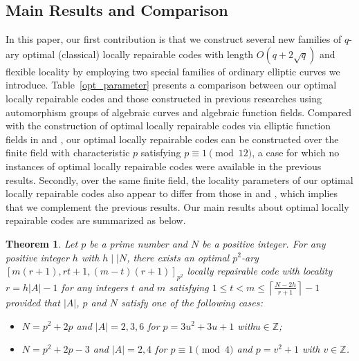 \documentclass[journal,12pt,onecolumn]{IEEEtran}
\newtheorem{theorem}{Theorem}
\begin{document}
\subsection{Main Results and Comparison}

In this paper, our first contribution is that we construct several new families of \(q\)-ary optimal (classical) locally repairable codes with length \(O(q+2\sqrt{q})\) and flexible locality by employing two special families of ordinary elliptic curves we introduce. Table~\ref{opt_parameter} presents a comparison between our optimal locally repairable codes and those constructed in previous researches using automorphism groups of algebraic curves and algebraic function fields. Compared with the construction of optimal locally repairable codes via elliptic function fields in \cite{Optimal_Locally_Repairable_Codes_Via_Elliptic_Curves} and \cite{MA2023105686}, our optimal locally repairable codes can be constructed over the finite field with characteristic \(p\) satisfying \( p \equiv 1 \pmod{12} \), a case for which no instances of optimal locally repairable codes were available in the previous results. Secondly, over the same finite field, the locality parameters of our optimal locally repairable codes also appear to differ from those in \cite{Optimal_Locally_Repairable_Codes_Via_Elliptic_Curves} and \cite{MA2023105686}, which implies that we complement the previous results. Our main results about optimal locally repairable codes are summarized as below. 

\begin{theorem}\label{opt_LRC_one_hA}
    Let \( p \) be a prime number and \(N\) be a positive integer. For any positive integer \( h \) with \(h\mid\mid N\), there exists an optimal \( p^2 \)-ary \([m(r+1), rt+1, (m-t)(r+1)]_{p^2}\) locally repairable code with locality \( r = h|A| - 1 \) for any integers \( t \) and \( m \) satisfying \(1 \leq t < m \leq \left\lceil \frac{N-2h}{r+1} \right\rceil-1 \) provided that \(|A|\), \( p \) and \(N\) satisfy one of the following cases:
    \begin{itemize}
        \item[(i)] \(N = p^2 + 2p\) and \(|A| = 2,3,6\) for \(p = 3u^2 + 3u + 1\) with\(u\in\mathbb{Z}\);
        \item[(ii)] \(N = p^2 + 2p - 3\) and \(|A| = 2,4\) for \( p \equiv 1 \pmod{4} \) and \(p = v^2 + 1\) with \(v\in\mathbb{Z}\).
    \end{itemize}
\end{theorem}
\end{document}
